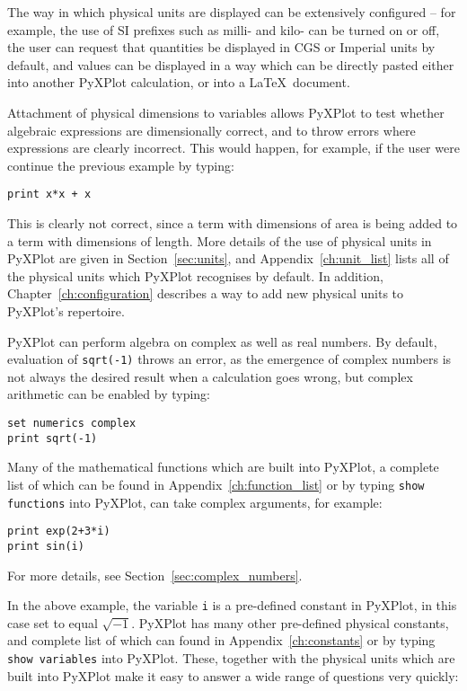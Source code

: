 \noindent The way in which physical units are displayed can be extensively
configured -- for example, the use of SI prefixes such as milli- and kilo- can
be turned on or off, the user can request that quantities be displayed in CGS
or Imperial units by default, and values can be displayed in a way which can be
directly pasted either into another PyXPlot calculation, or into a \LaTeX\
document.

Attachment of physical dimensions to variables allows PyXPlot to test whether
algebraic expressions are dimensionally correct, and to throw errors where
expressions are clearly incorrect. This would happen, for example, if the user
were continue the previous example by typing:

\begin{verbatim}
print x*x + x
\end{verbatim}

\noindent This is clearly not correct, since a term with dimensions of area is
being added to a term with dimensions of length. More details of the use of
physical units in PyXPlot are given in Section~\ref{sec:units}, and
Appendix~\ref{ch:unit_list} lists all of the physical units which PyXPlot
recognises by default. In addition, Chapter~\ref{ch:configuration} describes a
way to add new physical units to PyXPlot's repertoire.

PyXPlot can perform algebra on complex as well as real numbers. By default,
evaluation of {\tt sqrt(-1)} throws an error, as the emergence of complex
numbers is not always the desired result when a calculation goes wrong, but
complex arithmetic can be enabled by typing:\indcmd{set numerics complex}

\begin{verbatim}
set numerics complex
print sqrt(-1)
\end{verbatim}

\noindent Many of the mathematical functions which are built into PyXPlot, a
complete list of which can be found in Appendix~\ref{ch:function_list} or by
typing {\tt show functions} into PyXPlot, can take complex arguments, for
example:

\begin{verbatim}
print exp(2+3*i)
print sin(i)
\end{verbatim}

\noindent For more details, see Section~\ref{sec:complex_numbers}.

In the above example, the variable {\tt i} is a pre-defined constant in
PyXPlot, in this case set to equal $\sqrt{-1}$. PyXPlot has many other
pre-defined physical constants, and complete list of which can found in
Appendix~\ref{ch:constants} or by typing {\tt show variables} into PyXPlot.
These, together with the physical units which are built into PyXPlot make it
easy to answer a wide range of questions very quickly:

